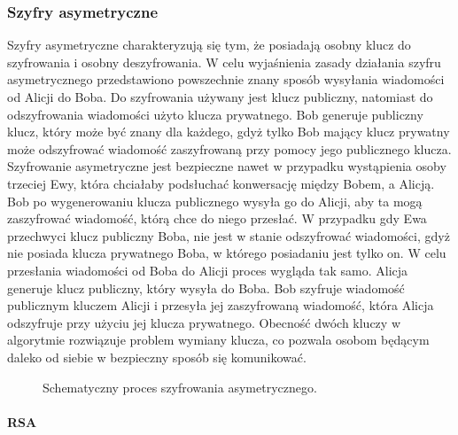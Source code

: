 \documentclass[12p]{article}
\begin{document}
\subsubsection{Szyfry asymetryczne}

\quad Szyfry asymetryczne charakteryzują się tym, że posiadają osobny klucz do szyfrowania i osobny deszyfrowania. W celu wyjaśnienia zasady działania szyfru asymetrycznego przedstawiono powszechnie znany sposób wysyłania wiadomości od Alicji do Boba. Do szyfrowania używany jest klucz publiczny, natomiast do odszyfrowania wiadomości użyto klucza prywatnego. Bob generuje publiczny klucz, który może być znany dla każdego, gdyż tylko Bob mający klucz prywatny może odszyfrować wiadomość zaszyfrowaną przy pomocy jego publicznego klucza. Szyfrowanie asymetryczne jest bezpieczne nawet w przypadku wystąpienia osoby trzeciej Ewy, która chciałaby podsłuchać konwersację między Bobem, a Alicją. Bob po wygenerowaniu klucza publicznego wysyła go do Alicji, aby ta mogą zaszyfrować wiadomość, którą chce do niego przesłać. W przypadku gdy Ewa przechwyci klucz publiczny Boba, nie jest w stanie odszyfrować wiadomości, gdyż nie posiada klucza prywatnego Boba, w którego posiadaniu jest tylko on. W celu przesłania wiadomości od Boba do Alicji proces wygląda tak samo. Alicja generuje klucz publiczny, który wysyła do Boba. Bob szyfruje wiadomość publicznym kluczem Alicji i przesyła jej zaszyfrowaną wiadomość, która Alicja odszyfruje przy użyciu jej klucza prywatnego. Obecność dwóch kluczy w algorytmie rozwiązuje problem wymiany klucza, co pozwala osobom będącym daleko od siebie w bezpieczny sposób się komunikować.  



\begin{figure}[H]
\begin{center}
\end{center}
\caption{Schematyczny proces szyfrowania asymetrycznego.}\label{szyfrowanie}
\end{figure}

\paragraph{RSA} \mbox{} \\
\end{document}
